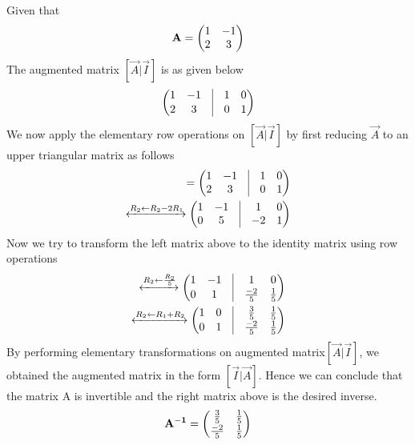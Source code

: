 
   Given that
    \begin{align}
    \mathbf{A} = \begin{pmatrix} 1 & -1 \\ 2 & 3\end{pmatrix}
    \end{align}
    The augmented matrix $ [\vec{A} | \vec{I}]$ is as given below 
    \begin{align}
	    \myvec{1 & -1 & \vrule & 1 & 0 \\[1 pt]  2 & 3 & \vrule & 0 & 1}
    \end{align}
    We now apply the elementary row operations on $ [\vec{A} | \vec{I}]$ by first reducing $\vec{A}$ to an upper triangular matrix as follows 
    \begin{align}
    [\vec{A} | \vec{I}] = \myvec{1 & -1 & \vrule & 1 & 0 \\ 2 & 3 & \vrule & 0 & 1}
    \\
    \xleftrightarrow{R_2\leftarrow R_2-2R_1}   
    \myvec{1 & -1 & \vrule & 1 & 0 \\ 0 & 5 & \vrule & -2 & 1}
    \end{align}
Now we try to transform the left matrix above to the identity matrix using row operations
    \begin{align}
    \xleftrightarrow{R_2\leftarrow \frac{R_2}{5}}
    \myvec{1 & -1 & \vrule & 1 & 0 \\[1 pt] 0 & 1 & \vrule & \frac {-2}{5} & \frac {1}{5}}
    \\
    \xleftrightarrow{R_2\leftarrow R_1+R_2}
    \myvec{1 & 0 & \vrule & \frac{3}{5} & \frac{1}{5}  \\[1 pt] 0 & 1 & \vrule & \frac{-2}{5} & \frac{1}{5}}
    \end{align}
    By performing elementary transformations on augmented matrix$ [\vec{A} | \vec{I}]$, we obtained the augmented matrix in the form $ [\vec{I} | \vec{A}]$. 
    Hence we can conclude that the matrix A is invertible and the right matrix above is the desired inverse.
    \begin{align}
   \mathbf{A^{-1}}=\begin{pmatrix} \frac{3}{5} & \frac{1}{5}  \\[1 pt]  \frac{-2}{5} & \frac{1}{5}\end{pmatrix} 
    \end{align}

